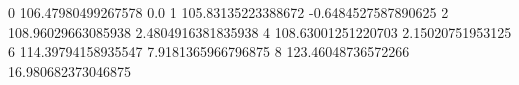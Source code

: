 0 106.47980499267578 0.0
1 105.83135223388672 -0.6484527587890625
2 108.96029663085938 2.4804916381835938
4 108.63001251220703 2.15020751953125
6 114.39794158935547 7.9181365966796875
8 123.46048736572266 16.980682373046875
